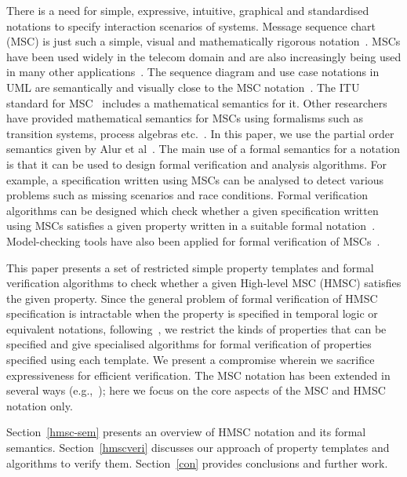 \documentclass{entcs}
\begin{document}
There is a need for simple, expressive, intuitive, graphical 
and standardised notations to specify interaction scenarios 
of systems. Message sequence chart (MSC) is just such a simple, 
visual and mathematically rigorous
notation~\cite{Rudolph96a,Haugen:2001:MID}. MSCs have 
been used widely in the telecom domain and are also 
increasingly being used in many other applications~\cite{Girish03}. The 
sequence diagram and use case notations in UML are semantically 
and visually close to the MSC
notation~\cite{Haugen:SDL:2001,Graubmann:2000:UML,Miga:2001:DMS,Feijs00}. 
The ITU standard for MSC~\cite{MSC96} includes a mathematical semantics for it. 
Other researchers have provided mathematical semantics for 
MSCs using formalisms such as transition systems, process 
algebras
etc.~\cite{Jonsson:2001:ESM,Mauw:1999:OSM,Mauw96,gehrke98algebraic}.  
In this paper, we use the 
partial order semantics given by Alur et al~\cite{Alur96}. The main 
use of a formal semantics for a notation is that it can be 
used to design formal verification and analysis algorithms. 
For example, a specification written using MSCs can be 
analysed to detect various problems such as missing scenarios 
and race conditions. Formal verification algorithms can be 
designed which check whether a given specification written 
using MSCs satisfies a given property written in a suitable formal
notation~\cite{Alur96,AEY01b,Peled00,LevPel97,1997:tacas:ben-abdallah,MuschollPeled00,MSP98,BVP02}.
Model-checking tools have also been applied for formal verification of
MSCs~\cite{AlurYannakakis99,GenestEtAl02}.

This paper presents a set of restricted simple property 
templates and formal verification algorithms to check whether a 
given High-level MSC (HMSC) satisfies the given property. 
Since the general problem of formal verification of HMSC 
specification is intractable when the property is specified 
in temporal logic or equivalent notations,
following~\cite{patterns-spec,model-checking-managers,BVP02},
we restrict the kinds of properties that can be 
specified and give specialised algorithms for formal 
verification of properties specified using each template. We 
present a compromise wherein we sacrifice expressiveness 
for efficient verification. The MSC notation has been 
extended in several ways (e.g.,~\cite{Silva98}); here we focus on the 
core aspects of the MSC and HMSC notation only. 

Section~\ref{hmsc-sem} presents an overview of HMSC notation and its 
formal semantics. Section~\ref{hmscveri} discusses our approach of 
property templates and algorithms to verify them.
Section~\ref{con} provides conclusions and further work.
\end{document}
